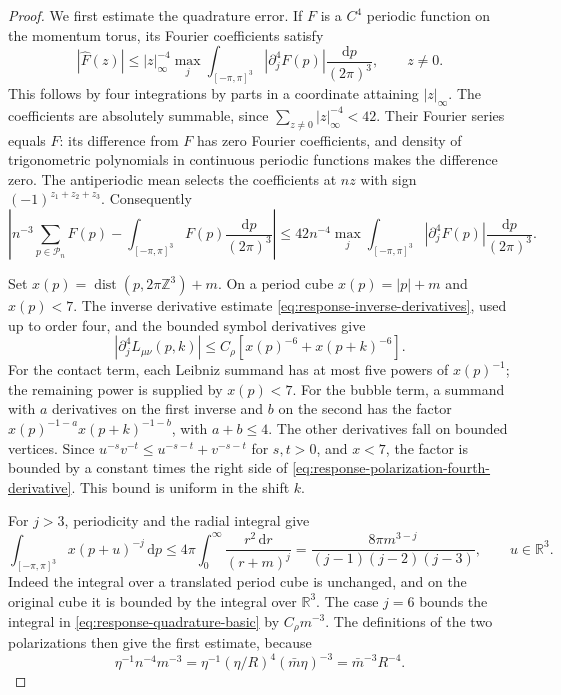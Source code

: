 \documentclass[11pt,letterpaper,reqno]{amsart}
\newcommand{\R}{\mathbb R}
\newcommand{\Z}{\mathbb Z}
\newcommand{\dd}{\mathrm d}
\begin{document}
\begin{proof}
We first estimate the quadrature error. If $F$ is a $C^4$
periodic function on the momentum torus, its Fourier coefficients
satisfy
\[
 |\widehat F(z)|\le |z|_\infty^{-4}
       \max_j\int_{[-\pi,\pi]^3}|\partial_j^4F(p)|
                                      \frac{\dd p}{(2\pi)^3},
                                                \qquad z\ne0.
\]
This follows by four integrations by parts in a coordinate attaining
$|z|_\infty$. The coefficients are absolutely summable, since
$\sum_{z\ne0}|z|_\infty^{-4}<42$. Their Fourier series equals
$F$: its difference from $F$ has zero Fourier coefficients,
and density of trigonometric polynomials in continuous periodic
functions makes the difference zero. The antiperiodic mean
selects the coefficients at $nz$ with sign $(-1)^{z_1+z_2+z_3}$.
Consequently
\begin{equation}\label{eq:response-quadrature-basic}
 \left|n^{-3}\sum_{p\in\mathcal P_n}F(p)
                  -\int_{[-\pi,\pi]^3}F(p)\frac{\dd p}{(2\pi)^3}\right|
 \le42n^{-4}\max_j
        \int_{[-\pi,\pi]^3}|\partial_j^4F(p)|
                                      \frac{\dd p}{(2\pi)^3}.
\end{equation}

Set $x(p)=\operatorname{dist}(p,2\pi\Z^3)+m$. On a period
cube $x(p)=|p|+m$ and $x(p)<7$. The inverse derivative
estimate \eqref{eq:response-inverse-derivatives}, used up
to order four, and the bounded symbol derivatives give
\begin{equation}\label{eq:response-polarization-fourth-derivative}
 |\partial_j^4L_{\mu\nu}(p,k)|
                 \le C_\rho[x(p)^{-6}+x(p+k)^{-6}].
\end{equation}
For the contact term, each Leibniz summand has at most five
powers of $x(p)^{-1}$; the remaining power is supplied by
$x(p)<7$. For the bubble term, a summand with $a$ derivatives
on the first inverse and $b$ on the second has the factor
$x(p)^{-1-a}x(p+k)^{-1-b}$, with $a+b\le4$.
The other derivatives fall on bounded vertices. Since
$u^{-s}v^{-t}\le u^{-s-t}+v^{-s-t}$ for $s,t>0$,
and $x<7$, the factor is bounded by a constant times the
right side of \eqref{eq:response-polarization-fourth-derivative}.
This bound is uniform in the shift $k$.

For $j>3$, periodicity and the radial integral give
\begin{equation}\label{eq:response-translated-integral}
 \int_{[-\pi,\pi]^3}x(p+u)^{-j}\,\dd p
 \le4\pi\int_0^\infty\frac{r^2\,\dd r}{(r+m)^j}
       =\frac{8\pi m^{3-j}}{(j-1)(j-2)(j-3)},
                                             \qquad u\in\R^3.
\end{equation}
Indeed the integral over a translated period cube is unchanged,
and on the original cube it is bounded by the integral over $\R^3$.
The case $j=6$ bounds the integral in
\eqref{eq:response-quadrature-basic} by $C_\rho m^{-3}$.
The definitions of the two polarizations then give the first
estimate, because
\[
 \eta^{-1}n^{-4}m^{-3}
           =\eta^{-1}(\eta/R)^4(\bar m\eta)^{-3}
           =\bar m^{-3}R^{-4}.
\]


\end{proof}
\end{document}
